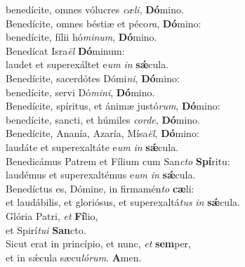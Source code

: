 \oddverse benedícite, omnes vólucres \textit{cæ}\textit{li}, \textbf{Dó}mino.\\
\evenverse Benedícite, omnes béstiæ et péco\textit{ra}, \textbf{Dó}mino:~\*\\
\evenverse benedícite, fílii hó\textit{mi}\textit{num}, \textbf{Dó}mino.\\
\oddverse Benedícat Isra\textit{ël} \textbf{Dó}minum:~\*\\
\oddverse laudet et superexáltet e\textit{um} \textit{in} \textbf{sǽ}cula.\\
\evenverse Benedícite, sacerdótes Dómi\textit{ni}, \textbf{Dó}mino:~\*\\
\evenverse benedícite, servi Dó\textit{mi}\textit{ni}, \textbf{Dó}mino.\\
\oddverse Benedícite, spíritus, et ánimæ justó\textit{rum}, \textbf{Dó}mino:~\*\\
\oddverse benedícite, sancti, et húmiles \textit{cor}\textit{de}, \textbf{Dó}mino.\\
\evenverse Benedícite, Ananía, Azaría, Mísa\textit{ël}, \textbf{Dó}mino:~\*\\
\evenverse laudáte et superexaltáte e\textit{um} \textit{in} \textbf{sǽ}cula.\\
\oddverse Benedicámus Patrem et Fílium cum San\textit{cto} \textbf{Spí}ritu:~\*\\
\oddverse laudémus et superexaltémus e\textit{um} \textit{in} \textbf{sǽ}cula.\\
\evenverse Benedíctus es, Dómine, in firmamén\textit{to} \textbf{cæ}li:~\*\\
\evenverse et laudábilis, et gloriósus, et superexaltá\textit{tus} \textit{in} \textbf{sǽ}cula.\\
\oddverse Glória Patri, \textit{et} \textbf{Fí}lio,~\*\\
\oddverse et Spirí\textit{tu}\textit{i} \textbf{San}cto.\\
\evenverse Sicut erat in princípio, et nunc, \textit{et} \textbf{sem}per,~\*\\
\evenverse et in sǽcula sæcu\textit{ló}\textit{rum}. \textbf{A}men.\\
